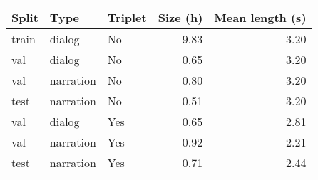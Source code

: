 \begin{tabular}{lllrr}
\toprule
Split &      Type & Triplet &  Size (h) &  Mean length (s) \\
\midrule
train &    dialog &      No &      9.83 &             3.20 \\
  val &    dialog &      No &      0.65 &             3.20 \\
  val & narration &      No &      0.80 &             3.20 \\
 test & narration &      No &      0.51 &             3.20 \\
  val &    dialog &     Yes &      0.65 &             2.81 \\
  val & narration &     Yes &      0.92 &             2.21 \\
 test & narration &     Yes &      0.71 &             2.44 \\
\bottomrule
\end{tabular}

